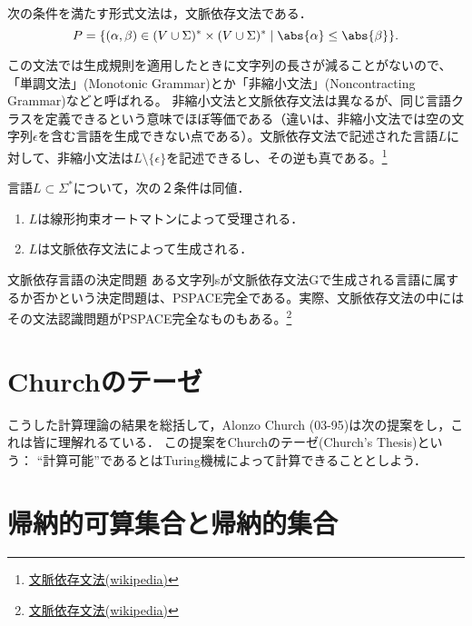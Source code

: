 \begin{proposition}[文脈依存文法の特徴付け]
    次の条件を満たす形式文法は，文脈依存文法である．
    \[P=\{(\alpha,\beta)\in(V\cup\Sigma)^*\times(V\cup\Sigma)^*\mid\abs{\alpha}\le\abs{\beta}\}.\]
\end{proposition}
\begin{remark}
    この文法では生成規則を適用したときに文字列の長さが減ることがないので、「単調文法」(Monotonic Grammar)とか「非縮小文法」(Noncontracting Grammar)などと呼ばれる。
    非縮小文法と文脈依存文法は異なるが、同じ言語クラスを定義できるという意味でほぼ等価である（違いは、非縮小文法では空の文字列$\epsilon$を含む言語を生成できない点である）。文脈依存文法で記述された言語$L$に対して、非縮小文法は$L\setminus\{\epsilon\}$を記述できるし、その逆も真である。\footnote{\href{https://ja.wikipedia.org/wiki/文脈依存文法}{文脈依存文法(wikipedia)}}
\end{remark}

\begin{theorem}
    言語$L\subset\Sigma^*$について，次の２条件は同値．
    \begin{enumerate}
        \item $L$は線形拘束オートマトンによって受理される．
        \item $L$は文脈依存文法によって生成される．
    \end{enumerate}
\end{theorem}

\begin{itembox}[l]{文脈依存言語の決定問題}
    ある文字列sが文脈依存文法Gで生成される言語に属するか否かという決定問題は、PSPACE完全である。実際、文脈依存文法の中にはその文法認識問題がPSPACE完全なものもある。\footnote{\href{https://ja.wikipedia.org/wiki/文脈依存文法}{文脈依存文法(wikipedia)}}
\end{itembox}

\section{Churchのテーゼ}

\begin{tcolorbox}[colframe=ForestGreen, colback=ForestGreen!10!white, breakable]
    こうした計算理論の結果を総括して，Alonzo Church (03-95)は次の提案をし，これは皆に理解れるている．
    この提案をChurchのテーゼ(Church's Thesis)という：
    “計算可能”であるとはTuring機械によって計算できることとしよう．
\end{tcolorbox}

\section{帰納的可算集合と帰納的集合}

